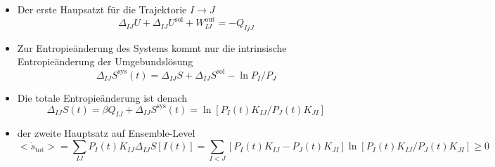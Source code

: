 \documentclass[aspectratio=1610, 9pt]{beamer}
\begin{document}
\begin{frame}%
  \begin{itemize}
  \item Der erste Haupsatzt für die Trajektorie $I \rightarrow J $
  \begin{equation*}
    \Delta_{IJ} U +  \Delta_{IJ} U^\text{sol} + W^\text{out}_{IJ} = - Q_{{IjJ}}
  \end{equation*}
    \item  Zur Entropieänderung des Systems kommt nur die intrinsische Entropieänderung der Umgebundslösung
    \begin{equation*}
      \Delta_{IJ}S^\text{sys}(t)= \Delta_{IJ}S + \Delta_{IJ}S^\text{sol}  - \ln P_I / P_J
    \end{equation*}
    \item Die totale Entropieänderung ist denach
    \begin{equation*}
      \Delta_{IJ} S(t) = \beta Q_{IJ} + \Delta_{IJ} S^\text{sys}(t) = \ln[P_I(t)K_{IJ}/P_J(t)K_{JI}]
    \end{equation*}
    \item der zweite Hauptsatz auf Ensemble-Level
    \begin{equation*}
      <\dot{s}_\text{tot}> = \sum_{IJ} P_I(t)K_{IJ} \Delta_{IJ} S[I(t)] = \sum_{I<J} [P_I(t)K_{IJ}-P_J(t)K_{JI}] \ln[P_I(t)K_{IJ}/P_J(t)K_{JI}] \geq 0
    \end{equation*}
  \end{itemize}
\end{frame}%
\end{document}
